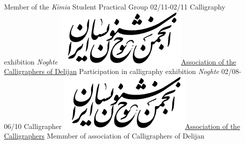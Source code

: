 \documentclass[a4paper]{friggeri-cv}
\begin{document}
\begin{entrylist}
        {Member of the \emph{Kimia} Student Practical Group}
        \entry
        {02/11-02/11}
        {    Calligraphy exhibition \emph{Noghte}}
        {\href{http://calligraphers.ir/}{\includegraphics[scale=0.15]{../assets/images/logos/Khoshnevisan_logo.png}Association of the Calligraphers of Delijan}}
        {Participation in calligraphy exhibition \emph{Noghte}}
        \entry
        {02/08-06/10}
        {   Calligrapher}
        {\href{http://calligraphers.ir/}{\includegraphics[scale=0.15]{../assets/images/logos/Khoshnevisan_logo.png}Association of the Calligraphers}}
        {Memmber of association of Calligraphers of Delijan}
    \end{entrylist}
    \\
\end{document}
